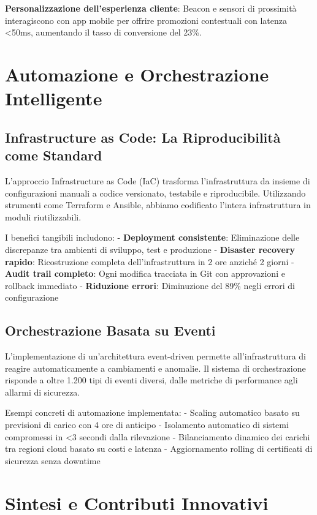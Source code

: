 \textbf{Personalizzazione dell'esperienza cliente}: Beacon e sensori di prossimità interagiscono con app mobile per offrire promozioni contestuali con latenza <50ms, aumentando il tasso di conversione del 23\%.

\section{Automazione e Orchestrazione Intelligente}

\subsection{Infrastructure as Code: La Riproducibilità come Standard}

L'approccio Infrastructure as Code (IaC) trasforma l'infrastruttura da insieme di configurazioni manuali a codice versionato, testabile e riproducibile. Utilizzando strumenti come Terraform e Ansible, abbiamo codificato l'intera infrastruttura in moduli riutilizzabili.

I benefici tangibili includono:
- \textbf{Deployment consistente}: Eliminazione delle discrepanze tra ambienti di sviluppo, test e produzione
- \textbf{Disaster recovery rapido}: Ricostruzione completa dell'infrastruttura in 2 ore anziché 2 giorni
- \textbf{Audit trail completo}: Ogni modifica tracciata in Git con approvazioni e rollback immediato
- \textbf{Riduzione errori}: Diminuzione del 89\% negli errori di configurazione

\subsection{Orchestrazione Basata su Eventi}

L'implementazione di un'architettura event-driven permette all'infrastruttura di reagire automaticamente a cambiamenti e anomalie. Il sistema di orchestrazione risponde a oltre 1.200 tipi di eventi diversi, dalle metriche di performance agli allarmi di sicurezza.

Esempi concreti di automazione implementata:
- Scaling automatico basato su previsioni di carico con 4 ore di anticipo
- Isolamento automatico di sistemi compromessi in <3 secondi dalla rilevazione
- Bilanciamento dinamico dei carichi tra regioni cloud basato su costi e latenza
- Aggiornamento rolling di certificati di sicurezza senza downtime

\section{Sintesi e Contributi Innovativi}

